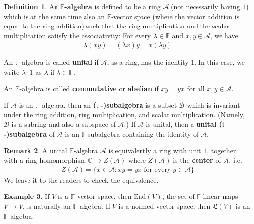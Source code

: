 \documentclass[12pt,b5paper,notitlepage]{article}
\theoremstyle{definition}
\newtheorem{df}{Definition}[section]
\newtheorem{eg}[df]{Example}
\newtheorem{rem}[df]{Remark}
\theoremstyle{plain}
\newcommand{\fk}{\mathfrak}
\newcommand{\End}{\mathrm{End}} %
\newcommand{\scr}{\mathscr}
\newcommand{\Cbb}{\mathbb C}
\newcommand{\Fbb}{\mathbb F}
\numberwithin{equation}{section}
\begin{document}
\begin{df}
An \textbf{$\Fbb$-algebra}   is defined to be a ring $\scr A$ (not necessarily having $1$) which is at the same time also an $\Fbb$-vector space (where the vector addition is equal to the ring addition) such that the ring multiplication and the scalar multiplication satisfy the associativity: For every $\lambda\in\Fbb$ and $x,y\in\scr A$, we have
\begin{align}
\lambda(xy)=(\lambda x)y=x(\lambda y)
\end{align}

An $\Fbb$-algebra is called \textbf{unital}  if $\scr A$, as a ring, has the identity $1$. In this case, we write $\lambda\cdot 1$ as $\lambda$ if $\lambda\in\Fbb$. 

An $\Fbb$-algebra is called \textbf{commutative} or \textbf{abelian}   if $xy=yx$ for all $x,y\in\scr A$.

If $\scr A$ is an $\Fbb$-algebra, then an \textbf{($\Fbb$-)subalgebra}  is a subset $\scr B$ which is invariant under the ring addition, ring multiplication, and scalar multiplication. (Namely, $\scr B$ is a subring and also a subspace of $\scr A$.) If $\scr A$ is unital, then a \textbf{unital ($\Fbb$-)subalgebra} of $\scr A$ is an $\Fbb$-subalgebra containing the identity of $\scr A$.  \hfill\qedsymbol
\end{df}


\begin{rem}
A unital $\Fbb$-algebra $\scr A$ is equivalently a ring with unit $1$, together with a ring homomorphism $\Cbb\rightarrow Z(\scr A)$ where $Z(\scr A)$ is the \textbf{center} of $\scr A$, i.e.
\begin{align*}
Z(\scr A)=\{x\in\scr A:xy=yx\text{ for every }y\in\scr A\}
\end{align*}
We leave it to the readers to check the equivalence.
\end{rem}


\begin{eg}
If $V$ is a $\Fbb$-vector space, then $\End(V)$, the set of $\Fbb$ linear maps $V\rightarrow V$, is naturally an $\Fbb$-algebra. If $V$ is a normed vector space, then $\fk L(V)$ is an $\Fbb$-algebra.
\end{eg}
\end{document}

